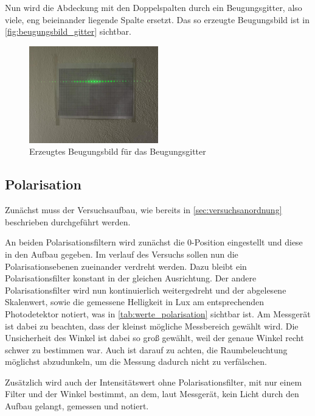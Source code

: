 \documentclass[12pt,english,ngerman]{scrartcl}
\begin{document}
Nun wird die Abdeckung mit den Doppelspalten durch ein Beugungsgitter, also viele, eng beieinander liegende Spalte ersetzt. 
Das so erzeugte Beugungsbild ist in \autoref{fig:beugungsbild_gitter} sichtbar.

\begin{figure}[H]
	\begin{center}
		\includegraphics[width =0.5\textwidth]{./figures/beugungsbild_gitter.jpg}
	\end{center}
	\caption[ Erzeugtes Beugungsbild für das Beugungsgitter] {
        Erzeugtes Beugungsbild für das Beugungsgitter
	}\label{fig:beugungsbild_gitter}
\end{figure}


\subsection{Polarisation}

Zunächst muss der Versuchsaufbau, wie bereits in \autoref{sec:versuchsanordnung} beschrieben durchgeführt werden.

An beiden Polarisationsfiltern wird zunächst die 0-Position eingestellt und diese in den Aufbau gegeben.
Im verlauf des Versuchs sollen nun die Polarisationsebenen zueinander verdreht werden. Dazu bleibt ein Polarisationsfilter 
konstant in der gleichen Ausrichtung. Der andere Polarisationsfilter wird nun kontinuierlich weitergedreht und der 
abgelesene Skalenwert, sowie die gemessene Helligkeit in Lux am entsprechenden Photodetektor notiert, was in 
\autoref{tab:werte_polarisation} sichtbar ist. Am Messgerät ist dabei zu beachten, dass der kleinst mögliche Messbereich
gewählt wird. Die Unsicherheit des Winkel ist dabei so groß gewählt, weil der genaue Winkel recht schwer zu bestimmen war.
Auch ist darauf zu achten, die Raumbeleuchtung möglichst abzudunkeln, um die Messung dadurch nicht zu verfälschen.


Zusätzlich wird auch der Intensitätswert ohne Polarisationsfilter, mit nur einem Filter und der Winkel bestimmt, an dem, 
laut Messgerät, kein Licht durch den Aufbau gelangt, gemessen und notiert.
\end{document}
